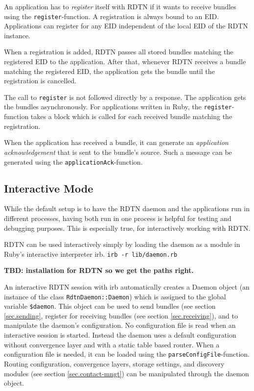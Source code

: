 \documentclass{article}
\begin{document}
An application has to {\em register} itself with RDTN if it wants to receive bundles using
the {\tt register}-function. A registration is always bound to an EID.
Applications can register for any EID independent of the local EID of the RDTN
instance.

When a registration is added, RDTN passes all stored bundles matching the
registered EID to the application. After that, whenever RDTN receives a bundle 
matching the registered EID, the application gets the bundle until the 
registration is cancelled.

The call to {\tt register} is not followed directly by a response. The
application gets the bundles asynchronously. For applications written in Ruby,
the {\tt register}-function takes a block which is called for each received
bundle matching the registration.

When the application has received a bundle, it can generate an {\em application
acknowledgement} that is sent to the bundle's source. Such a message can be
generated using the {\tt applicationAck}-function.

\subsection{Interactive Mode}\label{sec.interactive}

While the default setup is to have the RDTN daemon and the applications run in
different processes, having both run in one process is helpful for testing and
debugging purposes. This is especially true, for interactively working with
RDTN. 

RDTN can be used interactively simply by loading the daemon as a module in
Ruby's interactive interpreter irb. {\tt irb -r lib/daemon.rb}

{\bf TBD: installation for RDTN so we get the paths right.}

An interactive RDTN session with irb automatically creates a Daemon object (an
instance of the class {\tt RdtnDaemon::Daemon}) which is assigned to the global
variable {\tt \$daemon}. This object can be used to send bundles (see section
\ref{sec.sending}, register for receiving bundles (see section
\ref{sec.receiving}), and to manipulate the daemon's configuration. No
configuration file is read when an interactive session is started. Instead the
daemon uses a default configuration without convergence layer and with a static
table based router. When a configuration file is needed, it can be loaded
using the {\tt parseConfigFile}-function. Routing configuration, convergence
layers, storage settings, and discovery modules (see section
\ref{sec.contact-mngt}) can be manipulated through the daemon object.
\end{document}
